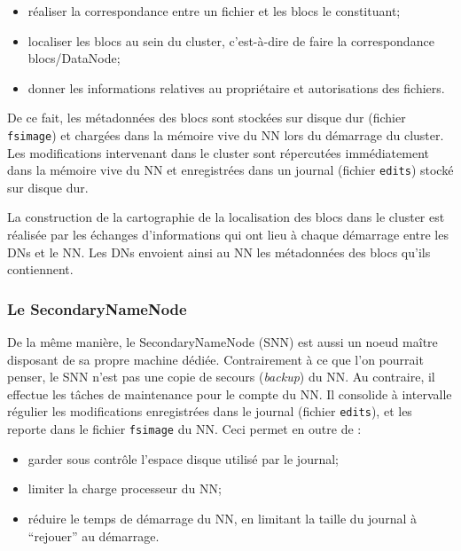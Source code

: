 \smallskip

\begin{itemize}
\item réaliser la correspondance entre un fichier et les blocs le constituant;
\item localiser les blocs au sein du cluster, c'est-à-dire de faire la correspondance blocs/DataNode;
\item donner les informations relatives au propriétaire et autorisations des fichiers.
\end{itemize}

\smallskip

\par De ce fait, les métadonnées des blocs sont stockées sur disque dur (fichier \texttt{fsimage}) et chargées dans la mémoire vive du NN lors du démarrage du cluster. Les modifications intervenant dans le cluster sont répercutées immédiatement dans la mémoire vive du NN et enregistrées dans un journal (fichier \texttt{edits}) stocké sur disque dur.

\par La construction de la cartographie de la localisation des blocs dans le cluster est réalisée par les échanges d'informations qui ont lieu à chaque démarrage entre les DNs et le NN. Les DNs envoient ainsi au NN les métadonnées des blocs qu'ils contiennent.

\subsubsection{Le SecondaryNameNode}
\label{sec:secondarynamenode}

\par De la même manière, le SecondaryNameNode (SNN) est aussi un noeud maître disposant de sa propre machine dédiée. Contrairement à ce que l'on pourrait penser, le SNN n'est pas une copie de secours (\textit{backup}) du NN. Au contraire, il effectue les tâches de maintenance pour le compte du NN. Il consolide à intervalle régulier les modifications enregistrées dans le journal (fichier \texttt{edits}), et les reporte dans le fichier \texttt{fsimage} du NN. Ceci permet en outre de :

\begin{itemize}
\item garder sous contrôle l'espace disque utilisé par le journal;
\item limiter la charge processeur du NN;
\item réduire le temps de démarrage du NN, en limitant la taille du journal à \textquotedblleft{}rejouer\textquotedblright{} au démarrage.
\end{itemize}

